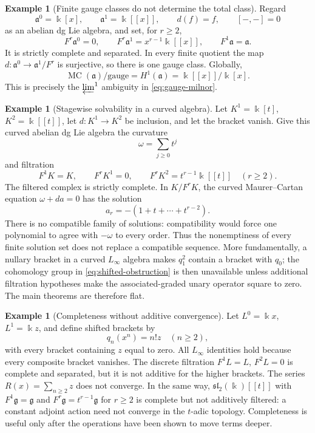 \documentclass[11pt]{article}
\theoremstyle{definition}
\newtheorem{example}[theorem]{Example}
\theoremstyle{remark}
\newcommand{\MC}{\operatorname{MC}}
\begin{document}
\begin{example}[Finite gauge classes do not determine the total class]
\label{ex:gauge-lim1}
Regard
\[
 \mathfrak a^0=\Bbbk[x],
 \qquad
 \mathfrak a^1=\Bbbk[[x]],
 \qquad
 d(f)=f,
 \qquad [-,-]=0
\]
as an abelian dg Lie algebra, and set, for $r\geq2$,
\[
 F^r\mathfrak a^0=0,
 \qquad
 F^r\mathfrak a^1=x^{r-1}\Bbbk[[x]],
 \qquad F^1\mathfrak a=\mathfrak a.
\]
It is strictly complete and separated.  In every finite quotient the map
$d:\mathfrak a^0\to\mathfrak a^1/F^r$ is surjective, so there is one gauge
class.  Globally,
\[
 \MC(\mathfrak a)/\text{gauge}
 =H^1(\mathfrak a)
 =\Bbbk[[x]]/\Bbbk[x].
 \tag{7.2}\label{eq:gauge-counterexample}
\]
This is precisely the $\varprojlim^1$ ambiguity in
\eqref{eq:gauge-milnor}.
\end{example}

\begin{example}[Stagewise solvability in a curved algebra]
\label{ex:curved}
Let $K^1=\Bbbk[t]$, $K^2=\Bbbk[[t]]$, let $d:K^1\to K^2$ be inclusion,
and let the bracket vanish.  Give this curved abelian dg Lie algebra the
curvature
\[
 \omega=\sum_{j\geq0}t^j
\]
and filtration
\[
 F^1K=K,
 \qquad
 F^rK^1=0,
 \qquad
 F^rK^2=t^{r-1}\Bbbk[[t]]\quad(r\geq2).
\]
The filtered complex is strictly complete.  In $K/F^rK$, the curved
Maurer--Cartan equation $\omega+da=0$ has the solution
\[
 a_r=-(1+t+\cdots+t^{r-2}).
\]
There is no compatible family of solutions: compatibility would force one
polynomial to agree with $-\omega$ to every order.  Thus the nonemptiness of
every finite solution set does
not replace a compatible sequence.  More fundamentally, a nullary bracket in a
curved $L_\infty$ algebra makes $q_1^2$ contain a bracket with $q_0$; the
cohomology group in \eqref{eq:shifted-obstruction} is then unavailable unless
additional filtration hypotheses make the associated-graded unary operator
square to zero.  The main theorems are therefore flat.
\end{example}

\begin{example}[Completeness without additive convergence]
Let $L^0=\Bbbk x$, $L^1=\Bbbk z$, and define shifted brackets by
\[
 q_n(x^n)=n!z\quad(n\geq2),
\]
with every bracket containing $z$ equal to zero.  All $L_\infty$ identities
hold because every composite bracket vanishes.  The discrete filtration
$F^1L=L$, $F^2L=0$ is complete and separated, but it is not additive for the
higher brackets.  The series $R(x)=\sum_{n\geq2}z$ does not converge.  In the
same way, $\mathfrak{sl}_2(\Bbbk)[[t]]$ with
$F^1\mathfrak g=\mathfrak g$ and
$F^r\mathfrak g=t^{r-1}\mathfrak g$ for $r\geq2$ is complete but not
additively filtered: a constant adjoint action need not converge in the
$t$-adic topology.  Completeness is useful only after the operations have
been shown to move terms deeper.
\end{example}
\end{document}

